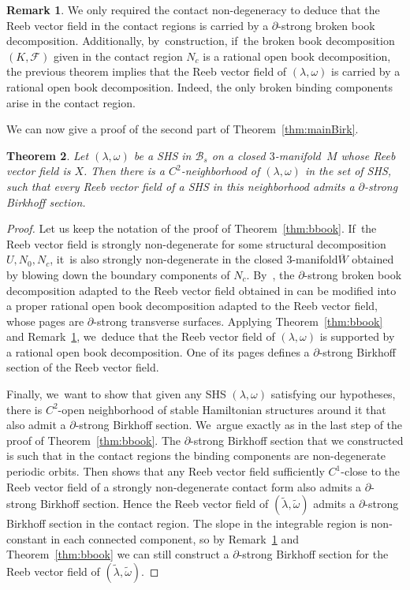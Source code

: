 \documentclass[JEP,XML,SOM,Unicode,NoEqCountersInSection,NoFloatCountersInSection,published]{cedram}
\newcommand{\threemanifold}{$3$\nobreakdash-mani\-fold\xspace}
\newtheorem{theorem}{Theorem}[section]
\theoremstyle{definition}
\newtheorem{Remark}[theorem]{Remark}
\begin{document}
\begin{Remark} \label{rem:bbook}
We only required the contact non-degeneracy to deduce that the Reeb vector field in the contact regions is carried by a $\partial$-strong broken book decomposition. Additionally, by~construction, if~the broken book decomposition $(K,\mathcal{F})$ given in the contact region $N_c$ is a rational open book decomposition, the previous theorem implies that the Reeb vector field of $(\lambda,\omega)$ is carried by a rational open book decomposition. Indeed, the only broken binding components arise in the contact region.
\end{Remark}

We can now give a proof of the second part of Theorem~\ref{thm:mainBirk}.

\begin{theorem}\label{thm:Bsection}
Let $(\lambda,\omega)$ be a SHS in $\mathcal{B}_s$ on a closed \threemanifold~$M$ whose Reeb vector field is $X$.
Then there is a $C^2$-neighborhood of $(\lambda,\omega)$ in the set of SHS, such that every Reeb vector field of a SHS in this neighborhood admits a $\partial$-strong Birkhoff section.
\end{theorem}

\begin{proof}
Let us keep the notation of the proof of Theorem~\ref{thm:bbook}. If~the Reeb vector field is strongly non-degenerate for some structural decomposition $U, N_0, N_c$, it~is also strongly non-degenerate in the closed \threemanifold $\overline W$ obtained by blowing down the boundary components of $N_c$. By~\cite[Th.\,A]{CM}, the $\partial$-strong broken book decomposition adapted to the Reeb vector field obtained in \cite[Th.\,1.1]{CDR} can be modified into a proper rational open book decomposition adapted to the Reeb vector field, whose pages are $\partial$-strong transverse surfaces. Applying Theorem~\ref{thm:bbook} and Remark~\ref{rem:bbook}, we~deduce that the Reeb vector field of $(\lambda,\omega)$ is supported by a rational open book decomposition. One of its pages defines a $\partial$-strong Birkhoff section of the Reeb vector field.

Finally, we~want to show that given any SHS $(\lambda,\omega)$ satisfying our hypotheses, there is $C^2$-open neighborhood of stable Hamiltonian structures around it that also admit a $\partial$-strong Birkhoff section. We~argue exactly as in the last step of the proof of Theorem~\ref{thm:bbook}. The $\partial$-strong Birkhoff section that we constructed is such that in the contact regions the binding components are non-degenerate periodic orbits. Then \cite[Prop.\,5.1]{CDHR} shows that any Reeb vector field sufficiently $C^1$-close to the Reeb vector field of a strongly non-degenerate contact form also admits a $\partial$-strong Birkhoff section. Hence the Reeb vector field of
$(\widetilde \lambda, \widetilde \omega)$ admits a $\partial$-strong Birkhoff section in the contact region. The slope in the integrable region is non-constant in each connected component, so by Remark~\ref{rem:bbook} and Theorem~\ref{thm:bbook} we can still construct a $\partial$-strong Birkhoff section for the Reeb vector field of $(\widetilde \lambda, \widetilde \omega)$.
\end{proof}
\end{document}

